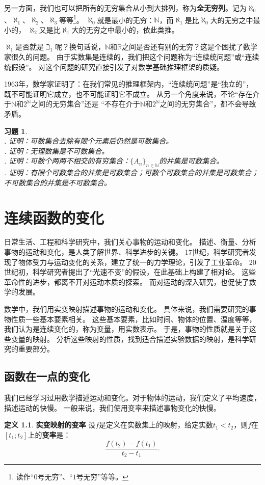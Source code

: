 \documentclass[12pt,UTF8]{ctexbook}
\theoremstyle{definition}
\newtheorem{df}{定义}[section]
\theoremstyle{plain}
\newtheorem{xt}{习题}[section]
\begin{document}
另一方面，我们也可以把所有的无穷集合从小到大排列，称为\textbf{全无穷列}。记为$\aleph_0$、$\aleph_1$、$\aleph_2$、$\aleph_3$等等\footnote{读作“$0$号无穷”、“$1$号无穷”等等。}。
$\aleph_0$就是最小的无穷：$\mathbb{N}$，而$\aleph_1$是比$\aleph_0$大的无穷之中最小的，
$\aleph_2$又是比$\aleph_1$大的无穷之中最小的，依此类推。

$\aleph_1$是否就是$\beth_1$呢？换句话说，$\mathbb{N}$和$\mathbb{R}$之间是否还有别的无穷？这是个困扰了数学家很久的问题。
由于实数集是连续的，我们把这个问题称为“连续统问题”或“连续统假设”。
对这个问题的研究直接引发了对数学基础推理框架的质疑。

1963年，数学家证明了：在我们常见的推理框架内，“连续统问题”是“独立的”，
既不可能证明它成立，也不可能证明它不成立。
从另一个角度来说，不论“存在介于$\mathbb{N}$和$2^\mathbb{N}$之间的无穷集合”还是
“不存在介于$\mathbb{N}$和$2^\mathbb{N}$之间的无穷集合”，都不会导致矛盾。

\begin{xt}
    \mbox{} \\
    . 证明：可数集合去除有限个元素后仍然是可数集合。\\
    . 证明：无理数集是不可数集合。\\
    . 证明：可数个两两不相交的有穷集合：$\{A_n\}_{n\in\mathbb{N}}$的并集是可数集合。\\
    . 证明：有限个可数集合的并集是可数集合；可数个可数集合的并集是可数集合；不可数集合的并集是不可数集合。
\end{xt}

\chapter{连续函数的变化}

日常生活、工程和科学研究中，我们关心事物的运动和变化。
描述、衡量、分析事物的运动和变化，是人类了解世界、科学进步的关键。
17世纪，科学研究者发现了物体受力与运动变化的关系，建立了统一的力学理论，引发了工业革命。
20世纪初，科学研究者提出了“光速不变”的假设，在此基础上构建了相对论。
这些革命性的进步，都离不开对运动本质的探索。
而对运动的深入研究，也促使了数学的发展。

数学中，我们用实变映射描述事物的运动和变化。
具体来说，我们需要研究的事物性质一些基本要素相关。
这些基本要素，比如时间、物体的位置、温度等等，我们认为是连续变化的，称为变量，用实数表示。
于是，事物的性质就是关于这些变量的映射。
分析这些映射的性质，找到适合描述实验数据的映射，是科学研究的重要部分。

\section{函数在一点的变化}
我们已经学习过用数学描述运动和变化。对于物体的运动，我们定义了平均速度，描述运动的快慢。
一般来说，我们使用变率来描述事物变化的快慢。
\begin{df}{\textbf{实变映射的变率}}
    设$f$是定义在实数集上的映射，给定实数$t_1 < t_2$，则$f$在$[t_1;t_2]$上的\textbf{变率}是：
    $$ \frac{f(t_2) - f(t_1)}{t_2 - t_1}.$$
\end{df}
\end{document}

